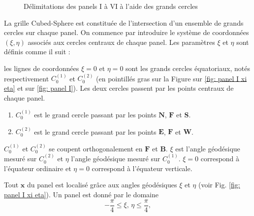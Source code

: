 \begin{figure}[htbp]
\begin{center}
\end{center}
\caption{Délimitations des panels I à VI à l'aide des grands cercles}
\label{fig: panel I to VI}
\end{figure}

La grille Cubed-Sphere est constituée de l'intersection d'un ensemble de grands cercles sur chaque panel. On commence par introduire le système de coordonnées $(\xi,\eta)$ associés aux cercles centraux de chaque panel. Les paramètres $\xi$ et  $\eta$ sont définis comme il suit :

\begin{definition}

les lignes de coordonnées $\xi = 0$ et $\eta = 0$ sont les grands cercles équatoriaux, notés respectivement $C_0^{(1)}$ et $C_0^{(2)}$ (en pointillés gras sur la Figure sur \ref{fig: panel I xi eta} et sur \ref{fig: panel I}).  Les deux cercles passent par les points centraux de chaque panel. 

\begin{enumerate}
\item $C_0^{(1)}$ est le grand cercle passant par les points $\mathbf{N}$, $\mathbf{F}$ et $\mathbf{S}$.

\item $C_0^{(2)}$ est le grand cercle passant par les points $\mathbf{E}$, $\mathbf{F}$ et $\mathbf{W}$.
\end{enumerate} 
$C_0^{(1)}$ et $C_0^{(2)}$ se coupent orthogonalement en $\mathbf{F}$ et $\mathbf{B}$.
$\xi$ est l'angle géodésique mesuré sur $C_0^{(2)}$ et $\eta$ l'angle géodésique mesuré sur $C_0^{(1)}$. $\xi = 0$ correspond à l'équateur ordinaire et $\eta=0$ correspond à l'équateur verticale.
\end{definition}

Tout $\mathbf{x}$ du panel est localisé grâce aux angles géodésiques $\xi$ et $\eta$  (voir Fig. \ref{fig: panel I xi eta}).
Un panel est donné par le domaine
\begin{equation}
- \dfrac{\pi}{4} \leq \xi\text{, }\eta \leq \dfrac{\pi}{4},
\end{equation}

